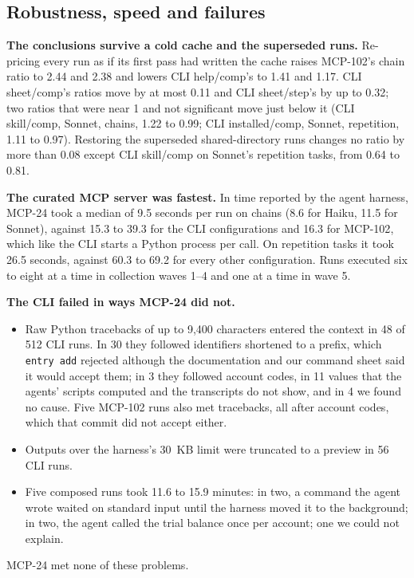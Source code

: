 \documentclass[sigconf,nonacm]{acmart}
\newcommand{\cmd}[1]{\texttt{#1}}
\newcommand{\cfg}[1]{\textsf{#1}}
\newcommand{\finding}[1]{\textbf{#1}}
\begin{document}
\subsection{Robustness, speed and failures}
\label{sec:robust}
\finding{The conclusions survive a cold cache and the superseded runs.} Re-pricing every run as if its first pass had written the cache raises \cfg{MCP-102}'s chain ratio to 2.44 and 2.38 and lowers \cfg{CLI help/comp}'s to 1.41 and 1.17. \cfg{CLI sheet/comp}'s ratios move by at most 0.11 and \cfg{CLI sheet/step}'s by up to 0.32; two ratios that were near 1 and not significant move just below it (\cfg{CLI skill/comp}, Sonnet, chains, 1.22 to 0.99; \cfg{CLI installed/comp}, Sonnet, repetition, 1.11 to 0.97). Restoring the superseded shared-directory runs changes no ratio by more than 0.08 except \cfg{CLI skill/comp} on Sonnet's repetition tasks, from 0.64 to 0.81.

\finding{The curated MCP server was fastest.} In time reported by the agent harness, \cfg{MCP-24} took a median of 9.5 seconds per run on chains (8.6 for Haiku, 11.5 for Sonnet), against 15.3 to 39.3 for the CLI configurations and 16.3 for \cfg{MCP-102}, which like the CLI starts a Python process per call. On repetition tasks it took 26.5 seconds, against 60.3 to 69.2 for every other configuration. Runs executed six to eight at a time in collection waves 1--4 and one at a time in wave 5.

\finding{The CLI failed in ways \cfg{MCP-24} did not.}
\begin{itemize}
\item Raw Python tracebacks of up to 9{,}400 characters entered the context in 48 of 512 CLI runs. In 30 they followed identifiers shortened to a prefix, which \cmd{entry add} rejected although the documentation and our command sheet said it would accept them; in 3 they followed account codes, in 11 values that the agents' scripts computed and the transcripts do not show, and in 4 we found no cause. Five \cfg{MCP-102} runs also met tracebacks, all after account codes, which that commit did not accept either.
\item Outputs over the harness's 30~KB limit were truncated to a preview in 56 CLI runs.
\item Five composed runs took 11.6 to 15.9 minutes: in two, a command the agent wrote waited on standard input until the harness moved it to the background; in two, the agent called the trial balance once per account; one we could not explain.
\end{itemize}
\cfg{MCP-24} met none of these problems.
\end{document}
